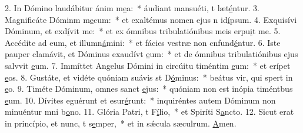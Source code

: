 2. In Dómino laudábitur ánim m\uline{e}a:~* áudiant mansuéti, t læt\uline{é}ntur.
3. Magnificáte Dóminm m\uline{e}cum:~* et exaltémus nomen ejus n id\uline{í}psum.
4. Exquisívi Dóminum, et exd\uline{í}vit me:~* et ex ómnibus tribulatiónibus meis erpu\uline{i}t me.
5. Accédite ad eum, et illumn\uline{á}mini:~* et fácies vestræ non cnfund\uline{é}ntur.
6. Iste pauper clamávit, et Dóminus exaudívt \uline{e}um:~* et de ómnibus tribulatiónibus ejus salvvit \uline{e}um.
7. Immíttet Angelus Dómini in circúitu timéntim \uline{e}um:~* et erípet \uline{e}os.
8. Gustáte, et vidéte quóniam suávis st D\uline{ó}minus:~* beátus vir, qui spert in \uline{e}o.
9. Timéte Dóminum, omnes sanct \uline{e}jus:~* quóniam non est inópia timéntbus \uline{e}um.
10. Dívites eguérunt et esur\uline{é}runt:~* inquiréntes autem Dóminum non minuéntur mni b\uline{o}no.
11. Glória Patri, t F\uline{í}lio,~* et Spiríti S\uline{a}ncto.
12. Sicut erat in princípio, et nunc, t s\uline{e}mper,~* et in sǽcula sæculrum. \uline{A}men.
